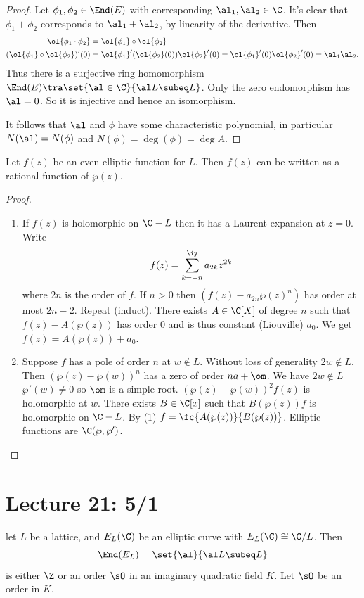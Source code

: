 \begin{proof}
Let $\phi_1,\phi_2\in \End(E)$ with corresponding $\al_1,\al_2\in \C$. It's clear that $\phi_1+\phi_2$ corresponds to $\al_1+\al_2$, by linearity of the derivative. Then
\begin{align*}
\ol{\phi_1\cdot \phi_2}&=\ol{\phi_1}\circ \ol{\phi_2}\\
(\ol{\phi_1}\circ \ol{\phi_2})'(0)&= \ol{\phi_1}'(\ol{\phi_2}(0))\ol{\phi_2}'(0)=\ol{\phi_1}'(0)\ol{\phi_2}'(0)=\al_1\al_2.
\end{align*}
Thus there is a surjective ring homomorphism $\End(E)\tra \set{\al\in \C}{\al L\subeq L}$. Only the zero endomorphism has $\al=0$. So it is injective and hence an isomorphism.

It follows that $\al$ and $\phi$ have some characteristic polynomial, in particular $N(\al)=N(\phi)$ and $N(\phi)=\deg(\phi)=\deg A$.
\end{proof}
\begin{lem}
Let $f(z)$ be an even elliptic function for $L$. Then $f(z)$ can be written as a rational function of $\wp(z)$.
\end{lem}
\begin{proof}
\begin{enumerate}
\item
If $f(z)$ is holomorphic on $\C-L$ then it has a Laurent expansion at $z=0$. Write
\[
f(z)=\sum_{k=-n}^{\iy} a_{2k} z^{2k}
\]
where $2n$ is the order of $f$. If $n>0$ then $(f(z)-a_{2n} \wp(z)^n)$ has order at most $2n-2$. Repeat (induct). There exists $A\in \C[X]$ of degree $n$ such that $f(z)-A(\wp(z))$ has order 0 and is thus constant (Liouville) $a_0$. We get $f(z)=A(\wp(z))+a_0$.
\item
Suppose $f$ has a pole of order $n$ at $w\nin L$. Without loss of generality $2w\nin L$. Then $(\wp(z)-\wp(w))^n$ has a zero of order $na+\om$. We have $2w \nin L$ $\wp'(w)\ne 0$ so $\om $ is a simple root. $(\wp(z)-\wp(w))^2f(z)$ is holomorphic at $w$. There exists $B\in \C[x]$ such that $B(\wp(z))f$ is holomorphic on $\C-L$. By (1) $f=\fc{A(\wp(z))}{B(\wp(z))}$. Elliptic functions are $\C(\wp,\wp')$.
\end{enumerate}
\end{proof}
\section{Lecture 21: 5/1}
let $L$ be a lattice, and $E_L(\C)$ be an elliptic curve with $E_L(\C)\cong \C/L$. Then
\[
\End(E_L)=\set{\al}{\al L\subeq L}
\]
is either $\Z$ or an order $\sO$ in an imaginary quadratic field $K$. Let $\sO$ be an order in $K$.

